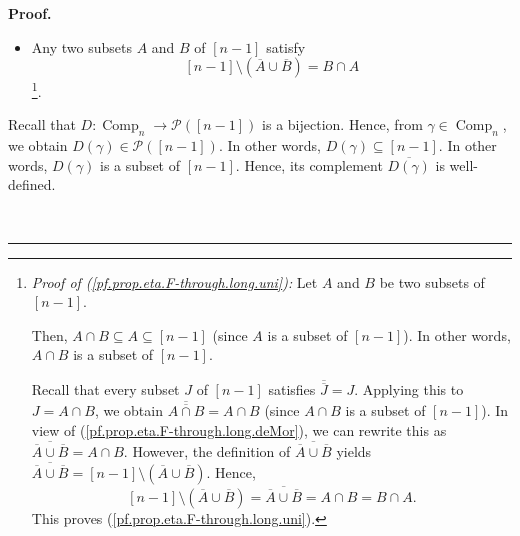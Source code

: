 \documentclass[numbers=enddot,12pt,final,onecolumn,notitlepage]{scrartcl}%
\theoremstyle{definition}
\newenvironment{proof}[1][Proof]{\noindent\textbf{#1.} }{\ \rule{0.5em}{0.5em}}
\newenvironment{verlong}{}{}
\begin{document}
\begin{verlong}
\begin{proof}
\begin{itemize}
\item Any two subsets $A$ and $B$ of $\left[  n-1\right]  $ satisfy
\begin{equation}
\left[  n-1\right]  \setminus\left(  \overline{A}\cup\overline{B}\right)
=B\cap A \label{pf.prop.eta.F-through.long.uni}%
\end{equation}
\footnote{\textit{Proof of (\ref{pf.prop.eta.F-through.long.uni}):} Let $A$
and $B$ be two subsets of $\left[  n-1\right]  $.
\par
Then, $A\cap B\subseteq A\subseteq\left[  n-1\right]  $ (since $A$ is a subset
of $\left[  n-1\right]  $). In other words, $A\cap B$ is a subset of $\left[
n-1\right]  $.
\par
Recall that every subset $J$ of $\left[  n-1\right]  $ satisfies
$\overline{\overline{J}}=J$. Applying this to $J=A\cap B$, we obtain
$\overline{\overline{A\cap B}}=A\cap B$ (since $A\cap B$ is a subset of
$\left[  n-1\right]  $). In view of (\ref{pf.prop.eta.F-through.long.deMor}),
we can rewrite this as $\overline{\overline{A}\cup\overline{B}}=A\cap B$.
However, the definition of $\overline{\overline{A}\cup\overline{B}}$ yields
$\overline{\overline{A}\cup\overline{B}}=\left[  n-1\right]  \setminus\left(
\overline{A}\cup\overline{B}\right)  $. Hence,%
\[
\left[  n-1\right]  \setminus\left(  \overline{A}\cup\overline{B}\right)
=\overline{\overline{A}\cup\overline{B}}=A\cap B=B\cap A.
\]
This proves (\ref{pf.prop.eta.F-through.long.uni}).}.
\end{itemize}

Recall that $D:\operatorname*{Comp}\nolimits_{n}\rightarrow\mathcal{P}\left(
\left[  n-1\right]  \right)  $ is a bijection. Hence, from $\gamma
\in\operatorname*{Comp}\nolimits_{n}$, we obtain $D\left(  \gamma\right)
\in\mathcal{P}\left(  \left[  n-1\right]  \right)  $. In other words,
$D\left(  \gamma\right)  \subseteq\left[  n-1\right]  $. In other words,
$D\left(  \gamma\right)  $ is a subset of $\left[  n-1\right]  $. Hence, its
complement $\overline{D\left(  \gamma\right)  }$ is well-defined.


\end{proof}
\end{verlong}
\end{document}
